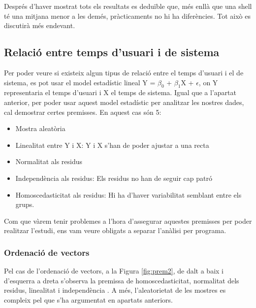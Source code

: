 \documentclass[12pt]{article}
\begin{document}
Després d'haver mostrat tots els resultats es deduïble que, més enllà que una shell té una mitjana menor a les demés,
pràcticaments no hi ha diferències. Tot això es discutirà més endevant.

\subsection{Relació entre temps d'usuari i de sistema}
Per poder veure si existeix algun tipus de relació entre el temps d'usuari i el de sistema, es pot usar el model estadístic
lineal Y = $\beta_{0}$ + $\beta_{1}$X + $\epsilon$, on Y representaria el temps d'usuari i X el temps de sistema. Igual que a l'apartat
anterior, per poder usar aquest model estadístic per analitzar les nostres dades, cal demostrar certes premisses. En aquest cas
són 5: 
\begin{itemize}
  \item Mostra aleatòria
  \item Linealitat entre Y i X: Y i X s'han de poder ajustar a una recta
  \item Normalitat als residus
  \item Independència als residus: Els residus no han de seguir cap patró
  \item Homoscedasticitat als residus: Hi ha d'haver variabilitat semblant entre els grups.
\end{itemize}

Com que vàrem tenir problemes a l'hora d'assegurar aquestes premisses per poder realitzar l'estudi, ens vam veure obligats a separar l'anàlisi
per programa. 

\subsubsection{Ordenació de vectors}
Pel cas de l'ordenació de vectors, a la Figura \ref{fig:prem2}, de dalt a baix i d'esquerra a dreta s'observa la premissa
de homoscedasticitat, normalitat dels residus, linealitat i independència . A més, l'aleatorietat de les mostres es compleix pel que s'ha 
argumentat en apartats anteriors.
\end{document}
